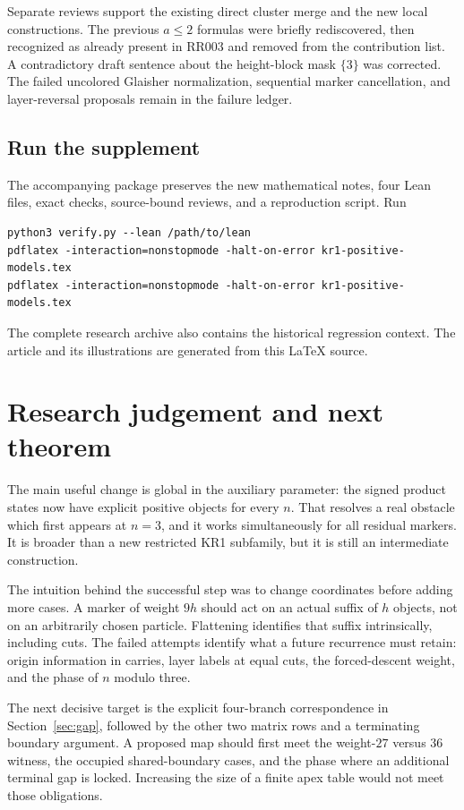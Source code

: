 \documentclass[11pt,a4paper]{article}
\theoremstyle{definition}
\begin{document}
Separate reviews support the existing direct cluster merge and the new local
constructions. The previous $a\le2$ formulas were briefly rediscovered, then
recognized as already present in RR003 and removed from the contribution list.
A contradictory draft sentence about the height-block mask $\{3\}$ was corrected.
The failed uncolored Glaisher normalization, sequential marker cancellation,
and layer-reversal proposals remain in the failure ledger.

\subsection{Run the supplement}

The accompanying package preserves the new mathematical notes, four Lean files,
exact checks, source-bound reviews, and a reproduction script. Run
\begin{verbatim}
python3 verify.py --lean /path/to/lean
pdflatex -interaction=nonstopmode -halt-on-error kr1-positive-models.tex
pdflatex -interaction=nonstopmode -halt-on-error kr1-positive-models.tex
\end{verbatim}
The complete research archive also contains the historical regression context.
The article and its illustrations are generated from this LaTeX source.

\section{Research judgement and next theorem}

The main useful change is global in the auxiliary parameter: the signed
product states now have explicit positive objects for every $n$.
That resolves a real obstacle which first appears at $n=3$, and it works
simultaneously for all residual markers. It is broader than a new restricted
KR1 subfamily, but it is still an intermediate construction.

The intuition behind the successful step was to change coordinates before
adding more cases. A marker of weight $9h$ should act on an actual suffix of
$h$ objects, not on an arbitrarily chosen particle. Flattening identifies that
suffix intrinsically, including cuts. The failed attempts identify what a
future recurrence must retain: origin information in carries, layer labels at
equal cuts, the forced-descent weight, and the phase of $n$ modulo three.

The next decisive target is the explicit four-branch correspondence in
Section~\ref{sec:gap}, followed by the other two matrix rows and a terminating
boundary argument. A proposed map should first meet the weight-$27$ versus
$36$ witness, the occupied shared-boundary cases, and the phase where an
additional terminal gap is locked. Increasing the size of a finite apex
table would not meet those obligations.
\end{document}
